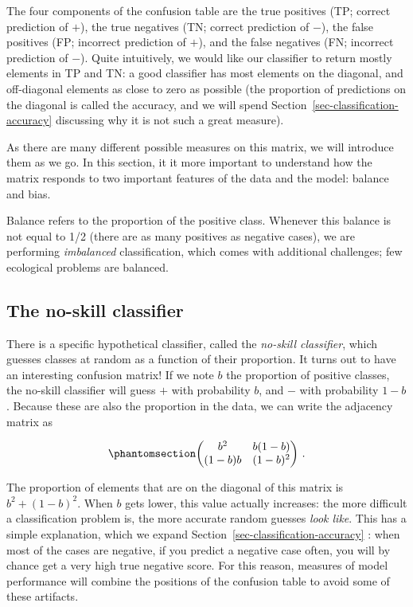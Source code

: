 \documentclass[
  letterpaper,
]{scrbook}
\begin{document}
The four components of the confusion table are the true positives (TP;
correct prediction of \(+\)), the true negatives (TN; correct prediction
of \(-\)), the false positives (FP; incorrect prediction of \(+\)), and
the false negatives (FN; incorrect prediction of \(-\)). Quite
intuitively, we would like our classifier to return mostly elements in
TP and TN: a good classifier has most elements on the diagonal, and
off-diagonal elements as close to zero as possible (the proportion of
predictions on the diagonal is called the accuracy, and we will spend
Section~\ref{sec-classification-accuracy} discussing why it is not such
a great measure).

As there are many different possible measures on this matrix, we will
introduce them as we go. In this section, it it more important to
understand how the matrix responds to two important features of the data
and the model: balance and bias.

Balance refers to the proportion of the positive class. Whenever this
balance is not equal to 1/2 (there are as many positives as negative
cases), we are performing \emph{imbalanced} classification, which comes
with additional challenges; few ecological problems are balanced.

\subsection{The no-skill classifier}\label{the-no-skill-classifier}

There is a specific hypothetical classifier, called the \emph{no-skill
classifier}, which guesses classes at random as a function of their
proportion. It turns out to have an interesting confusion matrix! If we
note \(b\) the proportion of positive classes, the no-skill classifier
will guess \(+\) with probability \(b\), and \(-\) with probability
\(1-b\). Because these are also the proportion in the data, we can write
the adjacency matrix as

\begin{equation}\phantomsection\label{eq-classification-noskill}{
\begin{pmatrix}
b^2 & b(1-b)\\
(1-b)b & (1-b)^2 
\end{pmatrix} \,.
}\end{equation}

The proportion of elements that are on the diagonal of this matrix is
\(b^2 + (1-b)^2\). When \(b\) gets lower, this value actually increases:
the more difficult a classification problem is, the more accurate random
guesses \emph{look like}. This has a simple explanation, which we expand
Section~\ref{sec-classification-accuracy} : when most of the cases are
negative, if you predict a negative case often, you will by chance get a
very high true negative score. For this reason, measures of model
performance will combine the positions of the confusion table to avoid
some of these artifacts.
\end{document}
